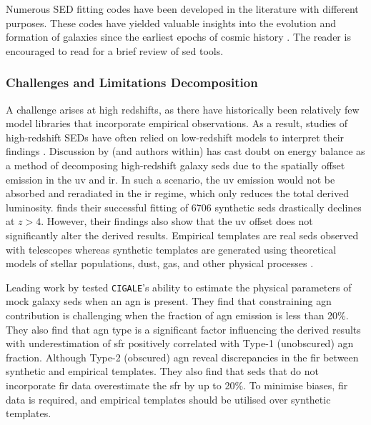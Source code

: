 Numerous SED fitting codes have been developed in the literature with different purposes. These codes have yielded valuable insights into the evolution and formation of galaxies since the earliest epochs of cosmic history \citep{walcher_fitting_2011, conroy_modeling_2013}. The reader is encouraged to read \cite{thorne_deep_2022} for a brief review of \gls{sed} tools.

\subsubsection{Challenges and Limitations  Decomposition}
A challenge arises at high redshifts, as there have historically been relatively few model libraries that incorporate empirical observations. As a result, studies of high-redshift SEDs have often relied on low-redshift models to interpret their findings \citep{conroy_modeling_2013, steinhardt_templates_2023}. Discussion by \cite{haskell_energy_2023} (and authors within) has cast doubt on energy balance as a method of decomposing high-redshift galaxy \gls{sed}s due to the spatially offset emission in the \gls{uv} and \gls{ir}. In such a scenario, the \gls{uv} emission would not be absorbed and reradiated in the \gls{ir} regime, which only reduces the total derived luminosity. \cite{haskell_energy_2023} finds their successful fitting of 6706 synthetic \gls{sed}s drastically declines at $z>4$. However, their findings also show that the \gls{uv} offset does not significantly alter the derived results. Empirical templates are real \gls{sed}s observed with telescopes whereas synthetic templates are generated using theoretical models of stellar populations, dust, gas, and other physical processes \citep{hayward_should_2015, haskell_energy_2023, steinhardt_templates_2023}.

Leading work by \cite{ciesla_constraining_2015} tested \texttt{CIGALE}'s ability to estimate the physical parameters of mock galaxy \gls{sed}s when an \gls{agn} is present. They find that constraining \gls{agn} contribution is challenging when the fraction of \gls{agn} emission is less than 20\%. They also find that \gls{agn} type is a significant factor influencing the derived results with underestimation of \gls{sfr} positively correlated with Type-1 (unobscured) \gls{agn} fraction. Although Type-2 (obscured) \gls{agn} reveal discrepancies in the \gls{fir} between synthetic and empirical templates. They also find that \gls{sed}s that do not incorporate \gls{fir} data overestimate the \gls{sfr} by up to 20\%. To minimise biases, \gls{fir} data is required, and empirical templates should be utilised over synthetic templates.

